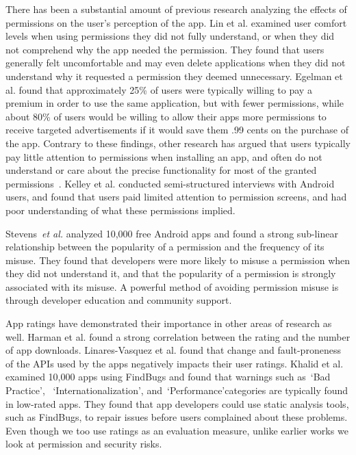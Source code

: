 \documentclass{sig-alternate-05-2015}
\begin{document}
There has been a substantial amount of previous research analyzing the effects of permissions on the user's perception of the app. Lin et al.\cite{Lin:2012:EPU:2370216.2370290} examined user comfort levels when using permissions they did not fully understand, or when they did not comprehend why the app needed the permission. They found that users generally felt uncomfortable and may even delete applications when they did not understand why it requested a permission they deemed unnecessary. Egelman et al.\cite{Egelman12choicearchitecture} found that approximately 25\% of users were typically willing to pay a premium in order to use the same application, but with fewer permissions, while about 80\% of users would be willing to allow their apps more permissions to receive targeted advertisements if it would save them .99 cents on the purchase of the app. Contrary to these findings, other research has argued that users typically pay little attention to permissions when installing an app, and often do not understand or care about the precise functionality for most of the granted permissions~\cite{Felt:2012:APU:2335356.2335360}. Kelley et al. \cite{Kelley:2012:CPI:2426020.2426027} conducted semi-structured interviews with Android users, and found that users paid limited attention to permission screens, and had poor understanding of what these permissions implied.




Stevens~\emph{et al.}\cite{Stevens:2013:APU:2487085.2487093} analyzed 10,000 free Android apps and found a strong sub-linear relationship between the popularity of a permission and the frequency of its misuse. They found that developers were more likely to misuse a permission when they did not understand it, and that the popularity of a permission is strongly associated with its misuse. A powerful method of avoiding permission misuse is through developer education and community support.


App ratings have demonstrated their importance in other areas of research as well. Harman et al.\cite{6224306} found a strong correlation between the rating and the number of app downloads. Linares-Vasquez et al.\cite{Linares-Vasquez:2013:ACF:2491411.2491428} found that change and fault-proneness of the APIs used by the apps negatively impacts their user ratings. Khalid et al.\cite{Khalid_Mei_Examinging} examined 10,000 apps using FindBugs and found that warnings such as~\lq Bad Practice\rq, ~\lq Internationalization\rq, and~\lq Performance\rq  categories are typically found in low-rated apps. They found that app developers could use static analysis tools, such as FindBugs, to repair issues before users complained about these problems. Even though we too use ratings as an evaluation measure, unlike earlier works we look at permission and security risks.
\end{document}
